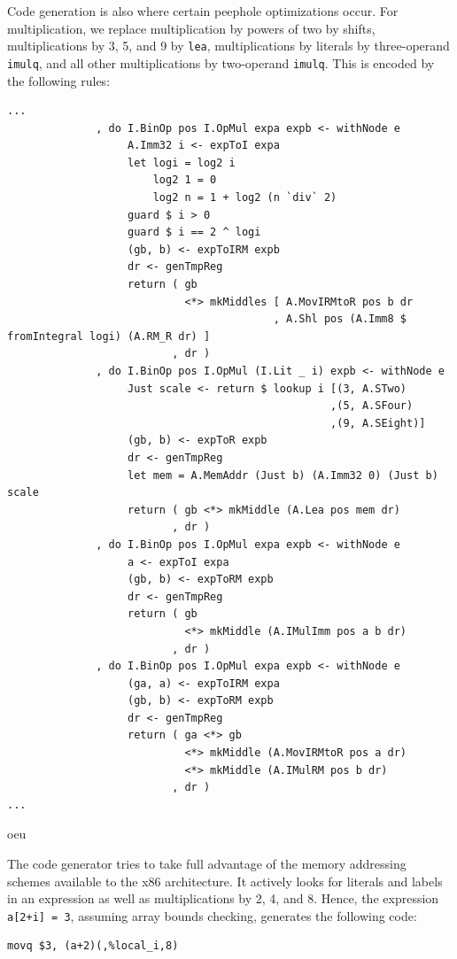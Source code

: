 \documentclass[11pt]{article}
\begin{document}
Code generation is also where certain peephole optimizations occur.
For multiplication, we replace multiplication by powers of two by
shifts, multiplications by 3, 5, and 9 by \texttt{lea},
multiplications by literals by three-operand \texttt{imulq}, and all
other multiplications by two-operand \texttt{imulq}.  This is encoded
by the following rules:
{\footnotesize
\begin{verbatim}
...
              , do I.BinOp pos I.OpMul expa expb <- withNode e
                   A.Imm32 i <- expToI expa
                   let logi = log2 i
                       log2 1 = 0
                       log2 n = 1 + log2 (n `div` 2)
                   guard $ i > 0
                   guard $ i == 2 ^ logi
                   (gb, b) <- expToIRM expb
                   dr <- genTmpReg
                   return ( gb
                            <*> mkMiddles [ A.MovIRMtoR pos b dr
                                          , A.Shl pos (A.Imm8 $ fromIntegral logi) (A.RM_R dr) ]
                          , dr )
              , do I.BinOp pos I.OpMul (I.Lit _ i) expb <- withNode e
                   Just scale <- return $ lookup i [(3, A.STwo)
                                                   ,(5, A.SFour)
                                                   ,(9, A.SEight)]
                   (gb, b) <- expToR expb
                   dr <- genTmpReg
                   let mem = A.MemAddr (Just b) (A.Imm32 0) (Just b) scale
                   return ( gb <*> mkMiddle (A.Lea pos mem dr)
                          , dr )
              , do I.BinOp pos I.OpMul expa expb <- withNode e
                   a <- expToI expa
                   (gb, b) <- expToRM expb
                   dr <- genTmpReg
                   return ( gb
                            <*> mkMiddle (A.IMulImm pos a b dr)
                          , dr )
              , do I.BinOp pos I.OpMul expa expb <- withNode e
                   (ga, a) <- expToIRM expa
                   (gb, b) <- expToRM expb
                   dr <- genTmpReg
                   return ( ga <*> gb
                            <*> mkMiddle (A.MovIRMtoR pos a dr)
                            <*> mkMiddle (A.IMulRM pos b dr)
                          , dr )
...
\end{verbatim}}

oeu

The code generator tries to take full advantage of the memory
addressing schemes available to the x86 architecture.  It actively
looks for literals and labels in an expression as well as
multiplications by 2, 4, and 8.  Hence, the expression
\texttt{a[2+i] = 3}, assuming array bounds checking, generates the
following code:
{\footnotesize
\begin{verbatim}
movq $3, (a+2)(,%local_i,8)
\end{verbatim}
}
\end{document}
